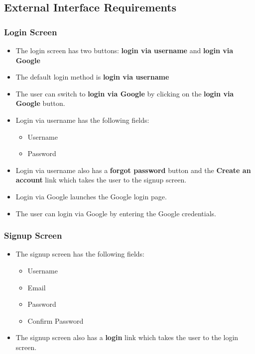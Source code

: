 \documentclass[conference,compsoc]{IEEEtran}
\begin{document}
\subsection{External Interface Requirements}
\subsubsection{Login Screen}
\vspace{0.2cm}
\begin{itemize}
    \item The login screen has two buttons: \textbf{login via username} and \textbf{login via Google}
    \item The default login method is \textbf{login via username}
    \item The user can switch to \textbf{login via Google} by clicking on the \textbf{login via Google} button.
    \item Login via username has the following fields:
          \begin{itemize}
              \item Username
              \item Password
          \end{itemize}
    \item Login via username also has a \textbf{forgot password} button and the \textbf{Create an account} link which takes the user to the signup screen.
    \item Login via Google launches the Google login page.
    \item The user can login via Google by entering the Google credentials.
\end{itemize}

\subsubsection{Signup Screen}
\vspace{0.2cm}
\begin{itemize}
    \item The signup screen has the following fields:
          \begin{itemize}
              \item Username
              \item Email
              \item Password
              \item Confirm Password
          \end{itemize}
    \item The signup screen also has a \textbf{login} link which takes the user to the login screen.
\end{itemize}
\end{document}
